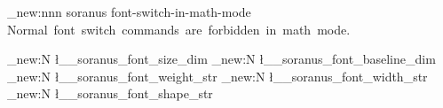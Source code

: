 %
%
%
% 
%


%

\msg_new:nnn { soranus } { font-switch-in-math-mode }
  { Normal~font~switch~commands~are~forbidden~in~math~mode. }


\dim_new:N \l__soranus_font_size_dim
\dim_new:N \l__soranus_font_baseline_dim
\str_new:N \l__soranus_font_weight_str
\str_new:N \l__soranus_font_width_str
\str_new:N \l__soranus_font_shape_str

